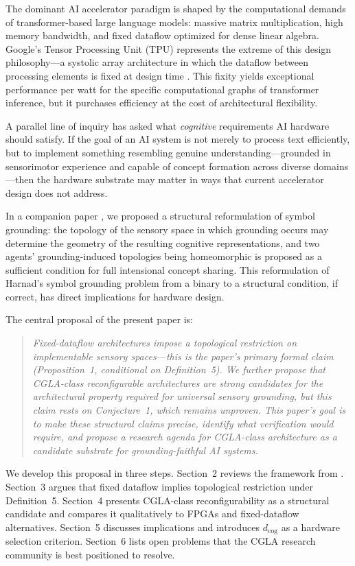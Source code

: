 \documentclass[12pt]{article}
\begin{document}
The dominant AI accelerator paradigm is shaped by the computational demands
of transformer-based large language models: massive matrix multiplication,
high memory bandwidth, and fixed dataflow optimized for dense linear algebra.
Google's Tensor Processing Unit (TPU) represents the extreme of this design
philosophy---a systolic array architecture in which the dataflow between
processing elements is fixed at design time \cite{jouppi2017}. This fixity
yields exceptional performance per watt for the specific computational
graphs of transformer inference, but it purchases efficiency at the cost of
architectural flexibility.

A parallel line of inquiry has asked what \emph{cognitive} requirements
AI hardware should satisfy. If the goal of an AI system is not merely to
process text efficiently, but to implement something resembling genuine
understanding---grounded in sensorimotor experience and capable of concept
formation across diverse domains---then the hardware substrate may matter
in ways that current accelerator design does not address.

In a companion paper \cite{minamoto2026topology}, we proposed a structural
reformulation of symbol grounding: the topology of the sensory space
in which grounding occurs may determine the geometry of the resulting
cognitive representations, and two agents' grounding-induced topologies
being homeomorphic is proposed as a sufficient condition for full
intensional concept sharing. This reformulation of Harnad's symbol
grounding problem \cite{harnad1990} from a binary to a structural
condition, if correct, has direct implications for hardware design.

The central proposal of the present paper is:

\begin{quote}
\emph{Fixed-dataflow architectures impose a topological restriction on
implementable sensory spaces---this is the paper's primary formal
claim (Proposition~1, conditional on Definition~5). We further
propose that CGLA-class reconfigurable architectures are strong
candidates for the architectural property required for universal
sensory grounding, but this claim rests on Conjecture~1, which
remains unproven. This paper's goal is to make these structural
claims precise, identify what verification would require, and
propose a research agenda for CGLA-class architecture as a
candidate substrate for grounding-faithful AI systems.}
\end{quote}

We develop this proposal in three steps. Section~2 reviews the
framework from \cite{minamoto2026topology}. Section~3 argues that fixed
dataflow implies topological restriction under Definition~5.
Section~4 presents CGLA-class reconfigurability as a structural
candidate and compares it qualitatively to FPGAs and fixed-dataflow
alternatives. Section~5 discusses implications and introduces
$d_{\mathrm{cog}}$ as a hardware selection criterion. Section~6
lists open problems that the CGLA research community is best
positioned to resolve.
\end{document}
